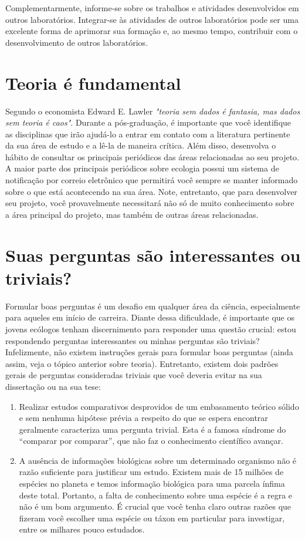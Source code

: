 \documentclass[twoside a4paper 12pt]{report}
\begin{document}
Complementarmente, informe-se sobre os trabalhos e atividades desenvolvidos em outros laboratórios. Integrar-se às atividades de outros laboratórios pode ser uma excelente forma de aprimorar sua formação e, ao mesmo tempo, contribuir com o desenvolvimento de outros laboratórios.

\section{Teoria é fundamental}

Segundo o economista Edward E. Lawler \emph{"teoria sem dados é fantasia, mas dados sem teoria é caos"}. Durante a pós-graduação, é importante que você identifique as disciplinas que irão ajudá-lo a entrar em contato com a literatura pertinente da sua área de estudo e a lê-la de maneira crítica. Além disso, desenvolva o hábito de consultar os principais periódicos das áreas relacionadas ao seu projeto. A maior parte dos principais periódicos sobre ecologia possui um sistema de notificação por correio eletrônico que permitirá você sempre se manter informado sobre o que está acontecendo na sua área. Note, entretanto, que para desenvolver seu projeto, você provavelmente necessitará não só de muito conhecimento sobre a área principal do projeto, mas também de outras áreas relacionadas.

\section{Suas perguntas são interessantes ou triviais?}

Formular boas perguntas é um desafio em qualquer área da ciência, especialmente para aqueles em início de carreira. Diante dessa dificuldade, é importante que os jovens ecólogos tenham discernimento para responder uma questão crucial: estou respondendo perguntas interessantes ou minhas perguntas são triviais? Infelizmente, não existem instruções gerais para formular boas perguntas (ainda assim, veja o tópico anterior sobre teoria). Entretanto, existem dois padrões gerais de perguntas consideradas triviais que você deveria evitar na sua dissertação ou na sua tese:

\begin{enumerate}
\item Realizar estudos comparativos desprovidos de um embasamento teórico sólido
e sem nenhuma hipótese prévia a respeito do que se espera encontrar geralmente
caracteriza uma pergunta trivial. Esta é a famosa síndrome do “comparar por
comparar”, que não faz o conhecimento científico avançar. 
\item A ausência de informações biológicas sobre um determinado organismo não é
razão suficiente para justificar um estudo. Existem mais de 15 milhões de espécies no
planeta e temos informação biológica para uma parcela ínfima deste total. Portanto, a
falta de conhecimento sobre uma espécie é a regra e não é um bom argumento. É crucial que você tenha claro outras razões que fizeram você escolher uma espécie ou táxon em particular para investigar, entre os milhares pouco estudados. 
\end{enumerate}
\end{document}
